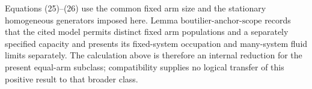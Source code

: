 Equations (25)--(26) use the common fixed arm size and the stationary homogeneous generators imposed here.  Lemma \(\mathrm{boutilier\mbox{-}anchor\mbox{-}scope}\) records that the cited model permits distinct fixed arm populations and a separately specified capacity and presents its fixed-system occupation and many-system fluid limits separately.  The calculation above is therefore an internal reduction for the present equal-arm subclass; compatibility supplies no logical transfer of this positive result to that broader class.
